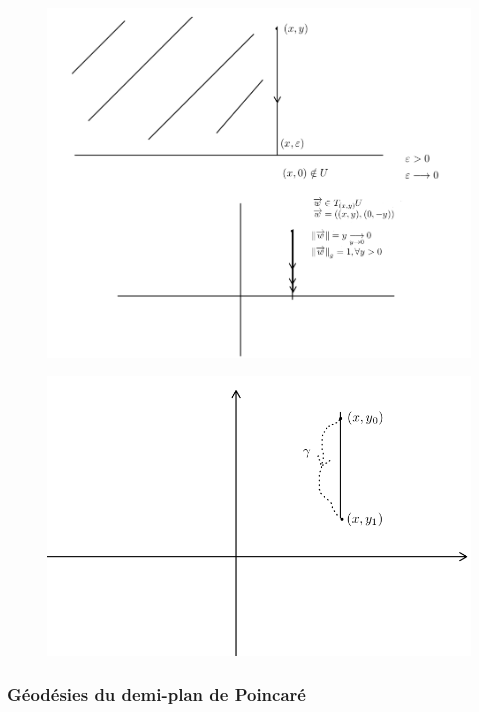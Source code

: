 \documentclass[french]{article}
\theoremstyle{definition}
\begin{document}
\begin{figure}[h!]
  \centering
  \includegraphics[scale=0.2]{figures/horizon1_corr.png}
  \caption{}
  \label{horizon1}
\end{figure}


\begin{figure}[h!]
  \centering
  \includegraphics[scale=0.3]{figures/horizon2.png}
  \caption{}
  \label{horizon2}
\end{figure}


\subsubsection{G\'eod\'esies du demi-plan de Poincar\'e}
\end{document}
